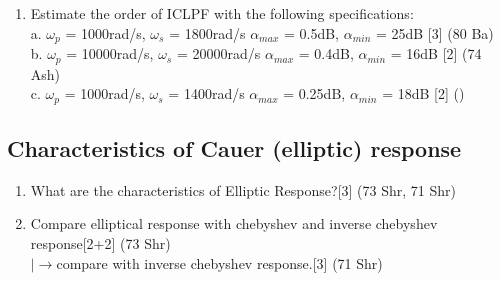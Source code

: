 \documentclass[12pt]{article}
\newcommand{\w}{\(\omega\)}
\newcommand{\lb}{\\$\left|\rightarrow\right.$}
\begin{document}
\begin{enumerate}
\item Estimate the order of ICLPF with the following specifications:\\
a. \w$_p$ = 1000rad/s, \w$_s$ = 1800rad/s \hspace{3cm}
$\alpha_{max}$ = 0.5dB, $\alpha_{min}$ = 25dB \hfill[3] (80 Ba)\\
b. \w$_p$ = 10000rad/s, \w$_s$ = 20000rad/s \hspace{2.5cm}
$\alpha_{max}$ = 0.4dB, $\alpha_{min}$ = 16dB \hfill[2] (74 Ash)\\
c. \w$_p$ = 1000rad/s, \w$_s$ = 1400rad/s \hspace{3cm}
$\alpha_{max}$ = 0.25dB, $\alpha_{min}$ = 18dB \hfill[2] ()
\end{enumerate}
\subsection{Characteristics of Cauer (elliptic) response}
\begin{enumerate}
\item What are the characteristics of Elliptic Response?\hfill[3] (73 Shr, 71 Shr)
\item Compare elliptical response with chebyshev and inverse chebyshev response\hfill[2+2] (73 Shr)
\lb compare with inverse chebyshev response.\hfill[3] (71 Shr)
\end{enumerate}
\end{document}
